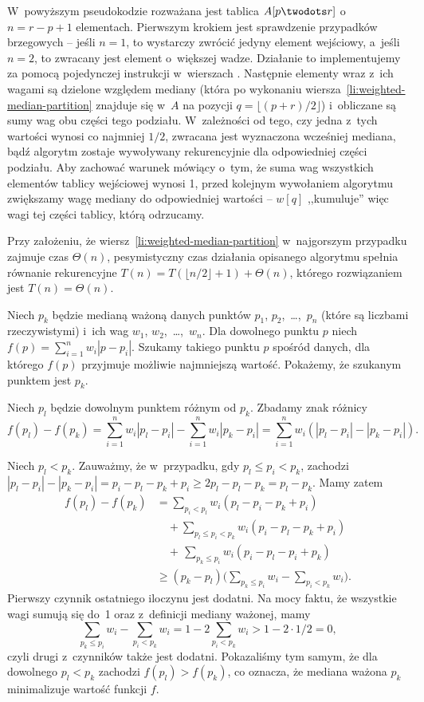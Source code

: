 W~powyższym pseudokodzie rozważana jest tablica $A[p\twodots r]$ o~$n=r-p+1$ elementach.
Pierwszym krokiem jest sprawdzenie przypadków brzegowych -- jeśli $n=1$, to wystarczy zwrócić jedyny element wejściowy, a~jeśli $n=2$, to zwracany jest element o~większej wadze.
Działanie to implementujemy za pomocą pojedynczej instrukcji  w~wierszach \doubledash{\ref{li:weighted-median-boundary-case-begin}}{\ref{li:weighted-median-boundary-case-end}}.
Następnie elementy wraz z~ich wagami są dzielone względem mediany (która po wykonaniu wiersza~\ref{li:weighted-median-partition} znajduje się w~$A$ na pozycji $q=\lfloor(p+r)/2\rfloor$) i~obliczane są sumy wag obu części tego podziału.
W~zależności od tego, czy jedna z~tych wartości wynosi co najmniej $1/2$, zwracana jest wyznaczona wcześniej mediana, bądź algorytm zostaje wywoływany rekurencyjnie dla odpowiedniej części podziału.
Aby zachować warunek mówiący o~tym, że suma wag wszystkich elementów tablicy wejściowej wynosi 1, przed kolejnym wywołaniem algorytmu zwiększamy wagę mediany do odpowiedniej wartości -- $w[q]$ ,,kumuluje'' więc wagi tej części tablicy, którą odrzucamy.

Przy założeniu, że wiersz~\ref{li:weighted-median-partition} w~najgorszym przypadku zajmuje czas $\Theta(n)$, pesymistyczny czas działania opisanego algorytmu spełnia równanie rekurencyjne $T(n)=T(\lfloor n/2\rfloor+1)+\Theta(n)$, którego rozwiązaniem jest $T(n)=\Theta(n)$.

\subproblem %
Niech $p_k$ będzie medianą ważoną danych punktów $p_1$, $p_2$,~\dots,~$p_n$ (które są liczbami rzeczywistymi) i~ich wag $w_1$, $w_2$,~\dots,~$w_n$.
Dla dowolnego punktu $p$ niech $f(p)=\sum_{i=1}^nw_i|p-p_i|$.
Szukamy takiego punktu $p$ spośród danych, dla którego $f(p)$ przyjmuje możliwie najmniejszą wartość.
Pokażemy, że szukanym punktem jest $p_k$.

Niech $p_l$ będzie dowolnym punktem różnym od $p_k$.
Zbadamy znak różnicy
\[
    f(p_l)-f(p_k) = \sum_{i=1}^nw_i|p_l-p_i|-\sum_{i=1}^nw_i|p_k-p_i| = \sum_{i=1}^nw_i(|p_l-p_i|-|p_k-p_i|).
\]

Niech $p_l<p_k$.
Zauważmy, że w~przypadku, gdy $p_l\le p_i<p_k$, zachodzi $|p_l-p_i|-|p_k-p_i|=p_i-p_l-p_k+p_i\ge2p_l-p_l-p_k=p_l-p_k$.
Mamy zatem
\begin{align*}
    f(p_l)-f(p_k) &= \sum_{p_i<p_l}w_i(p_l-p_i-p_k+p_i) \\
	&\quad {}+\!\!\!\sum_{p_l\le p_i<p_k}\!\!\!\!w_i(p_i-p_l-p_k+p_i) \\
	&\quad {}+\,\sum_{p_k\le p_i}w_i(p_i-p_l-p_i+p_k) \\
	&\ge (p_k-p_l)\biggl(\sum_{p_k\le p_i}w_i-\sum_{p_i<p_k}w_i\biggr).
\end{align*}
Pierwszy czynnik ostatniego iloczynu jest dodatni.
Na mocy faktu, że wszystkie wagi sumują się do~1 oraz z~definicji mediany ważonej, mamy
\[
    \sum_{p_k\le p_i}w_i-\sum_{p_i<p_k}w_i = 1-2\sum_{p_i<p_k}w_i > 1-2\cdot1/2 = 0,
\]
czyli drugi z~czynników także jest dodatni.
Pokazaliśmy tym samym, że dla dowolnego $p_l<p_k$ zachodzi $f(p_l)>f(p_k)$, co oznacza, że mediana ważona $p_k$ minimalizuje wartość funkcji $f$.

